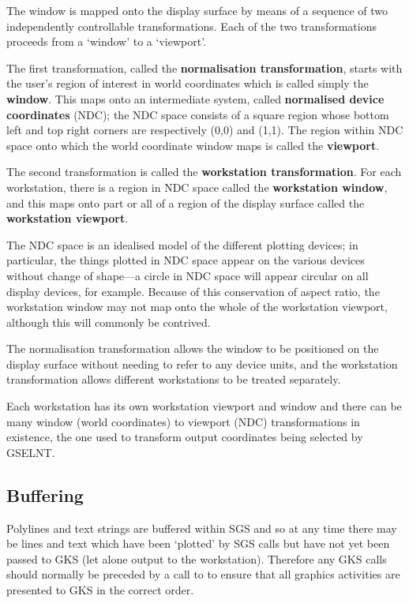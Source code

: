 \documentclass[11pt]{starlink}
\begin{document}
The window is mapped onto the display surface by means of
a sequence of two independently
controllable transformations.  Each of the
two transformations proceeds from a `window'
to a `viewport'.

The first transformation, called the
\textbf{normalisation transformation}, starts with the user's region
of interest in world coordinates which is called simply
the \textbf{window}.  This maps onto an intermediate
system, called \textbf{normalised device coordinates} (NDC);  the
NDC space consists
of a square region whose bottom left
and top right corners are respectively (0,0) and (1,1).  The
region within NDC space onto which the world coordinate
window maps is called the \textbf{viewport}.

The second transformation is called the \textbf{workstation
transformation}.  For each workstation, there
is a region in NDC space called the \textbf{workstation
window}, and this maps onto part or
all of a region of the
display surface called the \textbf{workstation viewport}.

The NDC space is an idealised model of the different
plotting devices;  in particular, the things plotted
in NDC space appear on the various devices without
change of shape---a circle in NDC space will appear
circular on all display devices, for example.  Because of this
conservation of aspect ratio, the workstation window
may not map onto the whole of the workstation
viewport, although this will commonly
be contrived.

The normalisation transformation allows
the window to be positioned
on the display surface without needing to refer to any
device units, and the workstation transformation
allows different workstations
to be treated separately.

Each workstation has its own workstation viewport and window and there can
be many window (world coordinates) to viewport (NDC)
transformations in existence,
the one used to transform output coordinates being selected by GSELNT.

\subsection* {Buffering}

Polylines and text strings are buffered within SGS and so at any time there
may be lines and text which have been `plotted' by SGS calls but have not yet
been passed to GKS (let alone output to the workstation).
Therefore any GKS calls should normally be preceded by a call to
 to
ensure that all graphics activities are presented to GKS  in the correct order.
\end{document}
